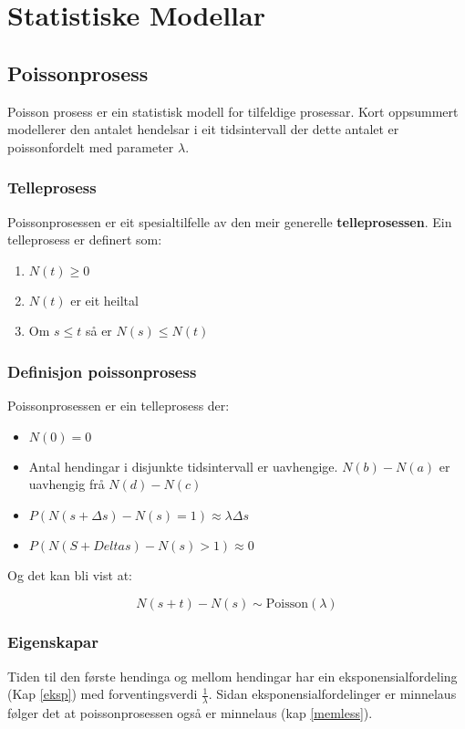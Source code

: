 \chapter{Statistiske Modellar}

\section{Poissonprosess}
Poisson prosess er ein statistisk modell for tilfeldige prosessar. Kort oppsummert modellerer den antalet hendelsar i eit tidsintervall der dette antalet er poissonfordelt med parameter $\lambda$.

\subsection{Telleprosess}
Poissonprosessen er eit spesialtilfelle av den meir generelle \textbf{telleprosessen}. Ein telleprosess er definert som:

\begin{enumerate}
    \item $N(t) \geq 0$ 
    \item $N(t)$ er eit heiltal
    \item Om $s \leq t$ så er $N(s) \leq N(t)$
\end{enumerate}

\subsection{Definisjon poissonprosess}
Poissonprosessen er ein telleprosess der:

\begin{itemize}
    \item $N(0) = 0$
    \item Antal hendingar i disjunkte tidsintervall er uavhengige. $N(b) - N(a)$ er uavhengig frå $N(d) - N(c)$
    \item $P(N(s + \Delta s) - N(s) = 1) \approx \lambda \Delta s$
    \item $P(N(S + Delta s) - N(s) > 1) \approx 0$
\end{itemize}

Og det kan bli vist at:

\begin{equation}
    N(s + t) - N(s) \sim \text{Poisson}(\lambda)
\end{equation}

\subsection{Eigenskapar}
Tiden til den første hendinga og mellom hendingar har ein eksponensialfordeling (Kap \ref{eksp}) med forventingsverdi $\frac{1}{\lambda}$. Sidan eksponensialfordelinger er minnelaus følger det at poissonprosessen også er minnelaus (kap \ref{memless}).


